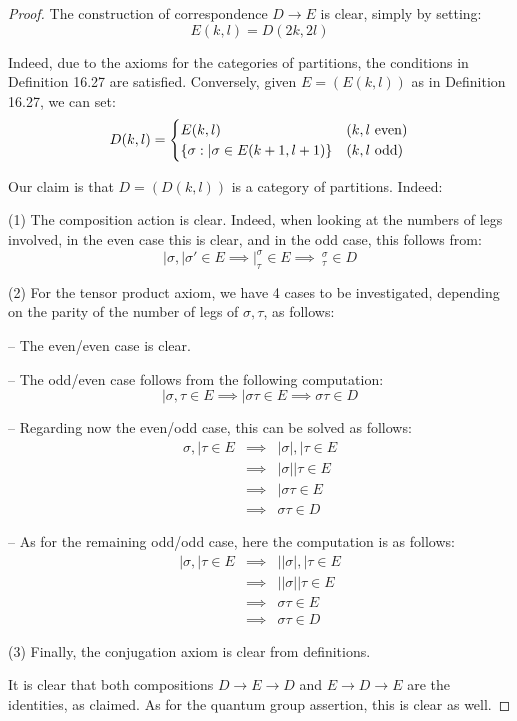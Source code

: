 \documentclass[12pt]{amsbook}
\begin{document}
\begin{proof}
The construction of correspondence $D\to E$ is clear, simply by setting:
$$E(k,l)=D(2k,2l)$$

Indeed, due to the axioms for the categories of partitions, the conditions in Definition 16.27 are satisfied. Conversely, given $E=(E(k,l))$ as in Definition 16.27, we can set:
$$D(k,l)=\begin{cases}
E(k,l)&(k,l\ {\rm even})\\
\{\sigma:|\sigma\in E(k+1,l+1)\}&(k,l\ {\rm odd})
\end{cases}$$

Our claim is that $D=(D(k,l))$ is a category of partitions. Indeed:

\medskip

(1) The composition action is clear. Indeed, when looking at the numbers of legs involved, in the even case this is clear, and in the odd case, this follows from:
$$|\sigma,|\sigma'\in E
\implies|^\sigma_\tau\in E
\implies{\ }^\sigma_\tau\in D$$

(2) For the tensor product axiom, we have 4 cases to be investigated, depending on the parity of the number of legs of $\sigma,\tau$, as follows:

\medskip

-- The even/even case is clear. 

\medskip

-- The odd/even case follows from the following computation:
$$|\sigma,\tau\in E
\implies|\sigma\tau\in E
\implies\sigma\tau\in D$$

-- Regarding now the even/odd case, this can be solved as follows:
\begin{eqnarray*}
\sigma,|\tau\in E
&\implies&|\sigma|,|\tau\in E\\
&\implies&|\sigma||\tau\in E\\
&\implies&|\sigma\tau\in E\\
&\implies&\sigma\tau\in D
\end{eqnarray*}

-- As for the remaining odd/odd case, here the computation is as follows:
\begin{eqnarray*}
|\sigma,|\tau\in E
&\implies&||\sigma|,|\tau\in E\\
&\implies&||\sigma||\tau\in E\\
&\implies&\sigma\tau\in E\\
&\implies&\sigma\tau\in D
\end{eqnarray*}

(3) Finally, the conjugation axiom is clear from definitions.

\medskip

It is clear that both compositions $D\to E\to D$ and $E\to D\to E$ are the identities, as claimed. As for the quantum group assertion, this is clear as well.
\end{proof}
\end{document}
